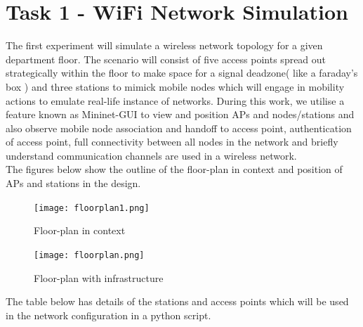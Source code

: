 \documentclass{article}
\begin{document}
\section{Task 1 - WiFi Network Simulation}
The first experiment will simulate a wireless network topology for a given department floor. The scenario will consist of five access points spread out strategically within the floor to make space for a signal deadzone( like a faraday's box ) and three stations to mimick mobile nodes which will engage in mobility actions to emulate real-life instance of networks. During this work, we utilise a feature known as Mininet-GUI to view and position APs and nodes/stations and also observe mobile node association and handoff to access point, authentication of access point, full connectivity between all nodes in the network and briefly understand communication channels are used in a wireless network. \\
The figures below show the outline of the floor-plan in context and position of APs and  stations in the design.
    \begin{figure}[h]
        \centering
        \texttt{[image: floorplan1.png]}
        \caption{Floor-plan in context}
        \label{FP}
        \endminipage
        \texttt{[image: floorplan.png]}
        \caption{Floor-plan with infrastructure}
        \label{FP-1}
        \endminipage
    \end{figure} 
\par The table below has details of the stations and access points which will be used in the network configuration in a python script.
\end{document}
